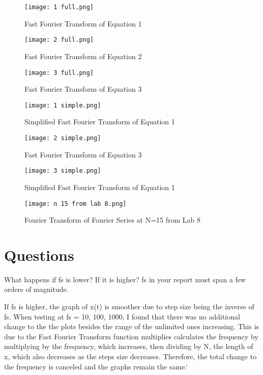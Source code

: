 \documentclass[12pt]{article}
\begin{document}
\begin{figure}[h!]
    \centering
    \texttt{[image: 1 full.png]}
    \caption{Fast Fourier Transform of Equation 1}
\end{figure}

\begin{figure}[h!]
    \centering
    \texttt{[image: 2 full.png]}
    \caption{Fast Fourier Transform of Equation 2}
\end{figure}

\newpage

\begin{figure}[h!]
    \centering
    \texttt{[image: 3 full.png]}
    \caption{Fast Fourier Transform of Equation 3}
\end{figure}

\begin{figure}[h!]
    \centering
    \texttt{[image: 1 simple.png]}
    \caption{Simplified Fast Fourier Transform of Equation 1}
\end{figure}

\newpage

\begin{figure}[h!]
    \centering
    \texttt{[image: 2 simple.png]}
    \caption{Fast Fourier Transform of Equation 3}
\end{figure}

\begin{figure}[h!]
    \centering
    \texttt{[image: 3 simple.png]}
    \caption{Simplified Fast Fourier Transform of Equation 1}
\end{figure}

\newpage

\begin{figure}[h!]
    \centering
    \texttt{[image: n 15 from lab 8.png]}
    \caption{Fourier Transform of Fourier Series at N=15 from Lab 8}
\end{figure}

\section{Questions}

What happens if fs is lower? If it is higher? fs in your report must span a few orders of magnitude.

If fs is higher, the graph of x(t) is smoother due to step size being the inverse of fs. When testing at fs = {10, 100, 1000}, I found that there was no additional change to the the plots besides the range of the unlimited ones increasing. This is due to the Fast Fourier Transform function multiplies calculates the frequency by multiplying by the frequency, which increases, then dividing by N, the length of x, which also decreases as the steps size decreases. Therefore, the total change to the frequency is canceled and the graphs remain the same.`
\end{document}
